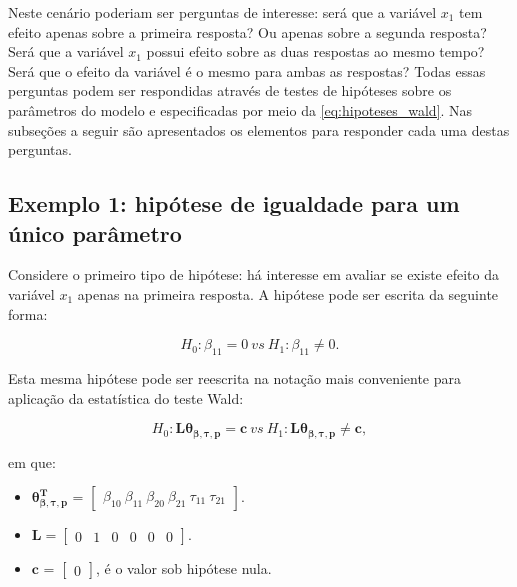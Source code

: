 Neste cenário poderiam ser perguntas de interesse: será que a variável $x_1$ tem efeito apenas sobre a primeira resposta? Ou apenas sobre a segunda resposta? Será que a variável $x_1$ possui efeito sobre as duas respostas ao mesmo tempo? Será que o efeito da variável é o mesmo para ambas as respostas? Todas essas perguntas podem ser respondidas através de testes de hipóteses sobre os parâmetros do modelo e especificadas por meio da \autoref{eq:hipoteses_wald}. Nas subseções a seguir são apresentados os elementos para responder cada uma destas perguntas. 

\subsection{Exemplo 1: hipótese de igualdade para um único parâmetro}

Considere o primeiro tipo de hipótese: há interesse em avaliar se existe efeito da variável $x_1$ apenas na primeira resposta. A hipótese pode ser escrita da seguinte forma:

\begin{equation}
H_0: \beta_{11} = 0 \ vs \ H_1: \beta_{11} \neq 0.
\end{equation}

Esta mesma hipótese pode ser reescrita na notação mais conveniente para aplicação da estatística do teste Wald:

\begin{equation}
H_0: \boldsymbol{L}\boldsymbol{\theta_{\beta,\tau,p}} = \boldsymbol{c} \ vs \ H_1: \boldsymbol{L}\boldsymbol{\theta_{\beta,\tau,p}} \neq \boldsymbol{c},
\end{equation}

\noindent em que:

\begin{itemize}
  
  \item $\boldsymbol{\theta_{\beta,\tau,p}^T}$ = $\begin{bmatrix} \beta_{10} \  \beta_{11} \ \beta_{20} \ \beta_{21} \ \tau_{11} \ \tau_{21} \end{bmatrix}$.


\item $\boldsymbol{L} = \begin{bmatrix} 0 & 1 & 0 & 0 & 0 & 0  \end{bmatrix}.$
 
\item $\boldsymbol{c}$ = $\begin{bmatrix} 0 \end{bmatrix}$, é o valor sob hipótese nula. 

\end{itemize}

